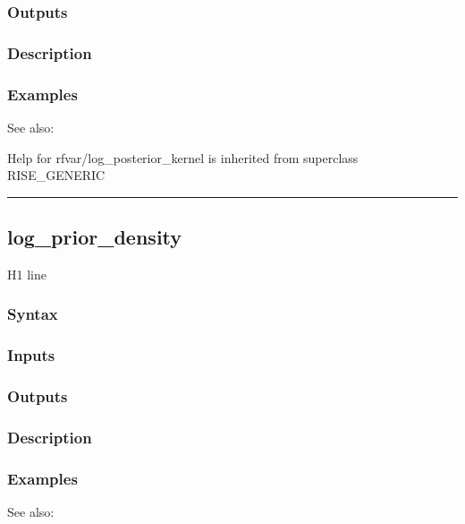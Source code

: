 \documentclass[letterpaper,10pt,english]{sphinxmanual}
\begin{document}
\subsubsection{Outputs}
\label{classes/models/@rfvar/rfvar:id63}

\subsubsection{Description}
\label{classes/models/@rfvar/rfvar:id64}

\subsubsection{Examples}
\label{classes/models/@rfvar/rfvar:id65}
See also:

Help for rfvar/log\_posterior\_kernel is inherited from superclass RISE\_GENERIC


\bigskip\hrule{}\bigskip



\subsection{log\_prior\_density}
\label{classes/models/@rfvar/rfvar:id66}\label{classes/models/@rfvar/rfvar:log-prior-density}
H1 line


\subsubsection{Syntax}
\label{classes/models/@rfvar/rfvar:id67}

\subsubsection{Inputs}
\label{classes/models/@rfvar/rfvar:id68}

\subsubsection{Outputs}
\label{classes/models/@rfvar/rfvar:id69}

\subsubsection{Description}
\label{classes/models/@rfvar/rfvar:id70}

\subsubsection{Examples}
\label{classes/models/@rfvar/rfvar:id71}
See also:
\end{document}
